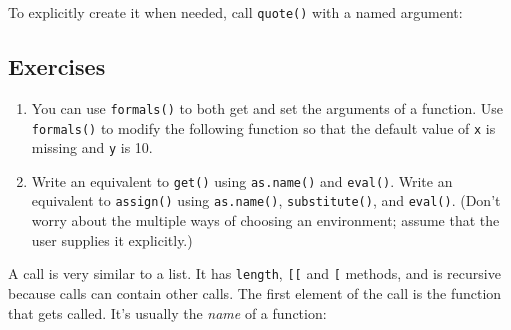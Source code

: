 To explicitly create it when needed, call \texttt{quote()} with a named
argument:

\begin{Shaded}
\begin{Highlighting}[]
\NormalTok{(}\NormalTok{)}
\end{Highlighting}
\end{Shaded}

\subsection{Exercises}

\begin{enumerate}
\def\labelenumi{\arabic{enumi}.}
\item
  You can use \texttt{formals()} to both get and set the arguments of a
  function. Use \texttt{formals()} to modify the following function so
  that the default value of \texttt{x} is missing and \texttt{y} is 10.

\begin{Shaded}
\begin{Highlighting}[]
\StringTok{ } 
  \StringTok{ }
\NormalTok{\}}
\end{Highlighting}
\end{Shaded}
\item
  Write an equivalent to \texttt{get()} using \texttt{as.name()} and
  \texttt{eval()}. Write an equivalent to \texttt{assign()} using
  \texttt{as.name()}, \texttt{substitute()}, and \texttt{eval()}. (Don't
  worry about the multiple ways of choosing an environment; assume that
  the user supplies it explicitly.)
\end{enumerate}


A call is very similar to a list. It has \texttt{length},
\texttt{{[}{[}} and \texttt{{[}} methods, and is recursive because calls
can contain other calls. The first element of the call is the function
that gets called. It's usually the \emph{name} of a function:

\begin{Shaded}
\begin{Highlighting}[]
\StringTok{ }\NormalTok{(}\NormalTok{(}\NormalTok{, } \NormalTok{))}
\NormalTok{x[[}\NormalTok{]]}
\NormalTok{(x[[}\NormalTok{]])}
\end{Highlighting}
\end{Shaded}

